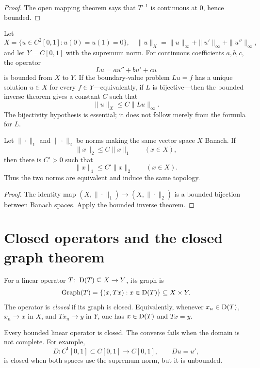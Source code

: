 \begin{proof}
The open mapping theorem says that $T^{-1}$ is continuous at $0$, hence
bounded.
\end{proof}

\begin{noteexample}
Let
\[
 X=\{u\in C^2[0,1]:u(0)=u(1)=0\},
 \quad
 \|u\|_X=\|u\|_\infty+\|u'\|_\infty+\|u''\|_\infty,
\]
and let $Y=C[0,1]$ with the supremum norm.  For continuous coefficients
$a,b,c$, the operator
\[
  Lu=a u''+b u'+cu
\]
is bounded from $X$ to $Y$.  If the boundary-value problem $Lu=f$ has a
unique solution $u\in X$ for every $f\in Y$---equivalently, if $L$ is
bijective---then the bounded inverse theorem gives a constant $C$ such that
\[
  \|u\|_X\le C\|Lu\|_\infty.
\]
The bijectivity hypothesis is essential; it does not follow merely from the
formula for $L$.
\end{noteexample}

\begin{notetheorem}
Let $\|\cdot\|_1$ and $\|\cdot\|_2$ be norms making the same vector space $X$
Banach.  If
\[
  \|x\|_2\le C\|x\|_1\qquad(x\in X),
\]
then there is $C'>0$ such that
\[
  \|x\|_1\le C'\|x\|_2\qquad(x\in X).
\]
Thus the two norms are equivalent and induce the same topology.
\end{notetheorem}

\begin{proof}
The identity map $(X,\|\cdot\|_1)\to(X,\|\cdot\|_2)$ is a bounded bijection
between Banach spaces.  Apply the bounded inverse theorem.
\end{proof}

\section{Closed operators and the closed graph theorem}

\begin{notedefinition}
For a linear operator $T\colon\operatorname{D}(T)\subseteq X\to Y$, its graph is
\[
  \operatorname{Graph}(T)=\{(x,Tx):x\in\operatorname{D}(T)\}\subseteq X\times Y.
\]
The operator is \emph{closed} if its graph is closed.  Equivalently,
whenever $x_n\in\operatorname{D}(T)$, $x_n\to x$ in $X$, and $Tx_n\to y$ in $Y$, one
has $x\in\operatorname{D}(T)$ and $Tx=y$.
\end{notedefinition}

\begin{noteremark}
Every bounded linear operator is closed.  The converse fails when the domain
is not complete.  For example,
\[
  D\colon C^1[0,1]\subset C[0,1]\to C[0,1],
  \qquad Du=u',
\]
is closed when both spaces use the supremum norm, but it is unbounded.
\end{noteremark}


